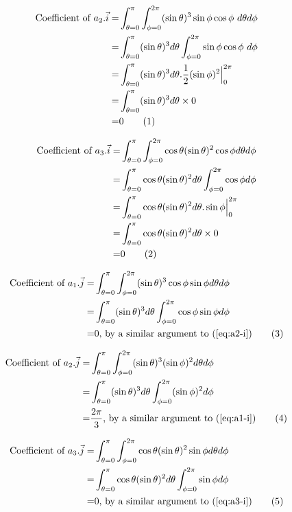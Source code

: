 \documentclass[]{article}
\newcommand\numberthis{\addtocounter{equation}{1}\tag{\theequation}}
\begin{document}
\begin{align*}
\text{Coefficient of }a_2.\vec{i} =&\int_{\theta=0}^{\pi}\int_{\phi=0}^{2\pi}(\sin\theta)^3\sin\phi\cos\phi\ d\theta d\phi\\=&\int_{\theta=0}^{\pi}(\sin\theta)^3d\theta\int_{\phi=0}^{2\pi}\sin\phi\cos\phi\  d\phi\\
=&\int_{\theta=0}^{\pi}(\sin\theta)^3d\theta . \frac{1}{2} (\sin \phi)^2 \Big|_0^{2\pi} \\
=&\int_{\theta=0}^{\pi}(\sin\theta)^3d\theta\times 0\\
=&0 \numberthis \label{eq:a2-i}
\end{align*}

\begin{align*}
\text{Coefficient of }a_3.\vec{i} =&\int_{\theta=0}^{\pi}\int_{\phi=0}^{2\pi}\cos\theta(\sin\theta)^2\cos\phi d\theta d\phi\\=&\int_{\theta=0}^{\pi}\cos\theta(\sin\theta)^2d\theta\int_{\phi=0}^{2\pi}\cos\phi  d\phi\\
=&\int_{\theta=0}^{\pi}\cos\theta(\sin\theta)^2d\theta . \sin\phi \Big|_0^{2\pi}\\
=&\int_{\theta=0}^{\pi}\cos\theta(\sin\theta)^2d\theta \times 0\\
=&0 \numberthis \label{eq:a3-i}
\end{align*}

\begin{align*}
\text{Coefficient of }a_1.\vec{j} =&\int_{\theta=0}^{\pi}\int_{\phi=0}^{2\pi}(\sin\theta)^3\cos\phi\sin\phi d\theta d\phi\\=&\int_{\theta=0}^{\pi}(\sin\theta)^3d\theta\int_{\phi=0}^{2\pi}\cos\phi\sin\phi  d\phi\\
=&0 \text{, by a similar argument to (\ref{eq:a2-i})}\numberthis \label{eq:a1-j}
\end{align*}

\begin{align*}
\text{Coefficient of }a_2.\vec{j} =&\int_{\theta=0}^{\pi}\int_{\phi=0}^{2\pi}(\sin\theta)^3(\sin\phi)^2 d\theta d\phi\\=&\int_{\theta=0}^{\pi}(\sin\theta)^3 d\theta \int_{\phi=0}^{2\pi}(\sin\phi)^2  d\phi\\
=& \frac{2\pi}{3} \text{, by a similar argument to (\ref{eq:a1-i})} \numberthis \label{eq:a2-j}
\end{align*}

\begin{align*}
\text{Coefficient of }a_3.\vec{j} =&\int_{\theta=0}^{\pi}\int_{\phi=0}^{2\pi}\cos\theta(\sin\theta)^2\sin\phi  d\theta d\phi\\=&\int_{\theta=0}^{\pi}\cos\theta(\sin\theta)^2d\theta\int_{\phi=0}^{2\pi}\sin\phi   d\phi\\=&0 \text{, by a similar argument to (\ref{eq:a3-i})} \numberthis \label{eq:a3-j}
\end{align*}
\end{document}
